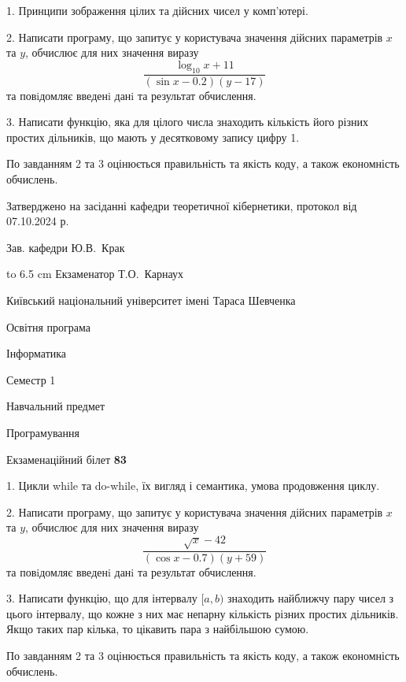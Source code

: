 \documentclass[12pt, ukrainian]{article}
\begin{document}
{%
1. Принципи зображення цілих та дійсних чисел у комп'ютері.%
\par
2. Написати програму, що запитує у користувача значення дійсних параметрів $x$ та $y$, обчислює для них значення виразу 
$$\frac{\log_{10} x + 11}{(\sin x - 0.2) (y - 17)}$$ 
та повiдомляє введенi данi та результат обчислення.

\par
3. Написати функцію, яка для цілого числа знаходить кількість його різних простих дільників, що мають у десятковому запису цифру 1.

По завданням 2 та 3 оцінюється правильність та якість коду, а також економність обчислень.

}
{\smallskip\smallskip \begin {scriptsize} Затверджено на засіданні кафедри теоретичної кібернетики, протокол   від   07.10.2024 р.\par\smallskip\smallskip\smallskip\smallskip
{\parbox {6.5 cm} {Зав. кафедри \dotfill Ю.В.~Крак}}\hspace {0.7cm} {\hbox to 6.5 cm { Екзаменатор \dotfill Т.О.~Карнаух}} \end{scriptsize}}
\vspace{0.9cm}
{{\begin {scriptsize}\par
{ \center  Київський національний університет імені Тараса Шевченка \par}
{\parbox {5 cm}{Освітня програма \hfill}{\parbox {7 cm}{Інформатика\hfill}}\parbox {6 cm}{\hfill Семестр 1}}\par
{\parbox {5 cm} {Навчальний предмет \hfill}\parbox {7 cm}{Програмування \hfill}\parbox {6cm}{\hfill}\par}\vspace{-15pt} \end{scriptsize}}{\center Екзаменаційний білет \No \textbf { 83 }\par}}
{%
1. Цикли while та do-while, їх вигляд і семантика, умова продовження циклу.%
\par
2. Написати програму, що запитує у користувача значення дійсних параметрів $x$ та $y$, обчислює для них значення виразу 
$$\frac{\sqrt x - 42}{(\cos x - 0.7) (y + 59)}$$ 
та повiдомляє введенi данi та результат обчислення.

\par
3. Написати функцію, що для інтервалу $[a, b)$ знаходить найближчу пару чисел з цього інтервалу, що кожне з них має непарну кількість різних простих дільників. Якщо таких пар кілька, то цікавить пара з найбільшою сумою.

По завданням 2 та 3 оцінюється правильність та якість коду, а також економність обчислень.

}
\end{document}
